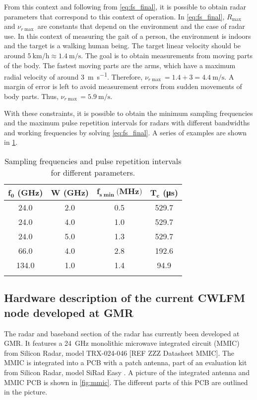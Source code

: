 From this context and following from \cref{eq:fs_final}, it is possible to obtain radar parameters that correspond to this context of operation. In \cref{eq:fs_final}, $R_{\max}$ and $\nu_{r\max}$ are constants that depend on the environment and the case of radar use. In this context of measuring the gait of a person, the environment is indoors and the target is a walking human being. The target linear velocity should be around $\SI{5}{\kilo\meter\per\hour} \approx \SI{1.4}{\meter\per\second}$. The goal is to obtain measurements from moving parts of the body. The fastest moving parts are the arms, which have a maximum radial velocity of around \SI{3}{\meter\per\second}. Therefore, $\nu_{r\max} = 1.4 + 3 = \SI{4.4}{\meter\per\second}$. A margin of error is left to avoid measurement errors from sudden movements of body parts. Thus, $\nu_{r\max} =\SI{5.9}{\meter\per\second}$.

With these constraints, it is possible to obtain the minimum sampling frequencies and the maximum pulse repetition intervals for radars with different bandwidths and working frequencies by solving \cref{eq:fs_final}. A series of examples are shown in \cref{tab:fs_Tc}.

\begin{longtable}{@{}cccc@{}}
	\toprule
	$\mathbf{f_0}$ \textbf{(GHz)}& $\mathbf{W}$ \textbf{(GHz)} & $\mathbf{f_{s\min}} \textbf{(MHz)}$& $\mathbf{T_c}$ \textbf{(\si{\micro\second})} \\* \midrule 
	\endhead
	24.0 & 2.0 & 0.5 & 529.7 \\
	24.0 & 4.0 & 1.0 & 529.7 \\
	24.0 & 5.0 & 1.3 & 529.7 \\
	66.0 & 4.0 & 2.8 & 192.6 \\
	134.0 & 1.0 & 1.4 & 94.9 \\* \bottomrule
	\caption{Sampling frequencies and pulse repetition intervals for different parameters.}
	\label{tab:fs_Tc} 
\end{longtable}
\subsection{Hardware description of the current CWLFM node developed at GMR}

The radar and baseband section of the radar has currently been developed at GMR. It features a \SI{24}{\giga\hertz} monolithic microwave integrated circuit (MMIC) from Silicon Radar, model TRX-024-046 [REF ZZZ Datasheet MMIC]. The MMIC is integrated into a PCB with a patch antenna, part of an evaluation kit from Silicon Radar, model SiRad Easy . A picture of the integrated antenna and MMIC PCB is shown in \cref{fig:mmic}. The different parts of this PCB are outlined in the picture.

